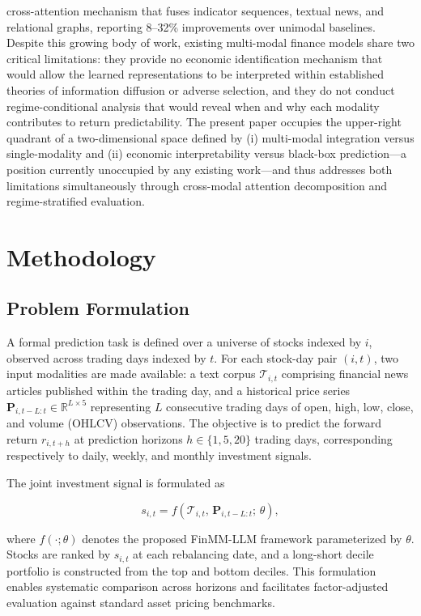 \documentclass[
  11pt,
  a4paper,
]{article}
\begin{document}
cross-attention mechanism that fuses indicator sequences, textual news,
and relational graphs, reporting 8--32\% improvements over unimodal
baselines. Despite this growing body of work, existing multi-modal
finance models share two critical limitations: they provide no economic
identification mechanism that would allow the learned representations to
be interpreted within established theories of information diffusion or
adverse selection, and they do not conduct regime-conditional analysis
that would reveal when and why each modality contributes to return
predictability. The present paper occupies the upper-right quadrant of a
two-dimensional space defined by (i) multi-modal integration versus
single-modality and (ii) economic interpretability versus black-box
prediction---a position currently unoccupied by any existing work---and
thus addresses both limitations simultaneously through cross-modal
attention decomposition and regime-stratified evaluation.

\section{Methodology}\label{methodology}

\subsection{Problem Formulation}\label{problem-formulation}

A formal prediction task is defined over a universe of stocks indexed by
\(i\), observed across trading days indexed by \(t\). For each stock-day
pair \((i, t)\), two input modalities are made available: a text corpus
\(\mathcal{T}_{i,t}\) comprising financial news articles published
within the trading day, and a historical price series
\(\mathbf{P}_{i,t-L:t} \in \mathbb{R}^{L \times 5}\) representing \(L\)
consecutive trading days of open, high, low, close, and volume (OHLCV)
observations. The objective is to predict the forward return
\(r_{i,t+h}\) at prediction horizons \(h \in \{1, 5, 20\}\) trading
days, corresponding respectively to daily, weekly, and monthly
investment signals.

The joint investment signal is formulated as

\[s_{i,t} = f\!\left(\mathcal{T}_{i,t},\, \mathbf{P}_{i,t-L:t};\, \theta\right),\]

where \(f(\cdot;\theta)\) denotes the proposed FinMM-LLM framework
parameterized by \(\theta\). Stocks are ranked by \(s_{i,t}\) at each
rebalancing date, and a long-short decile portfolio is constructed from
the top and bottom deciles. This formulation enables systematic
comparison across horizons and facilitates factor-adjusted evaluation
against standard asset pricing benchmarks.
\end{document}
